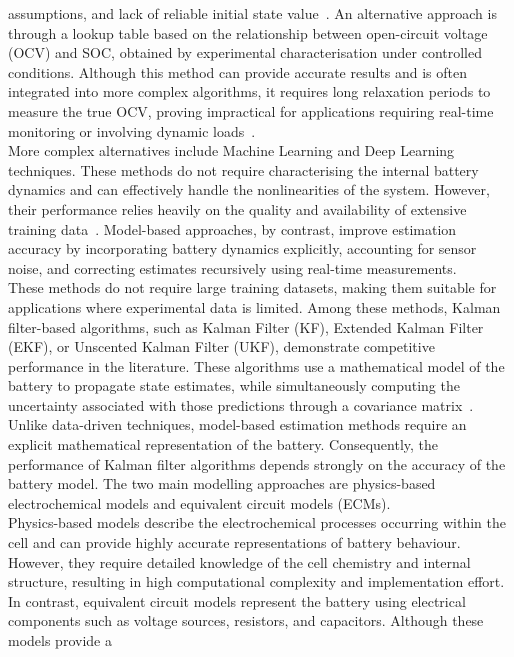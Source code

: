 assumptions, and lack of reliable initial state value~\cite{plett2015battery}. 
An alternative approach is through a lookup table based on the relationship between open-circuit voltage (\acs{OCV}) and \acs{SOC}, 
obtained by experimental characterisation under controlled conditions.
Although this method can provide accurate results and is often integrated into more complex algorithms, it requires 
long relaxation periods to measure the true \acs{OCV}, proving impractical for applications requiring real-time monitoring 
or involving dynamic loads~\cite{SOCSOH}.
\\
More complex alternatives include Machine Learning and Deep Learning techniques. These methods do not require characterising
the internal battery dynamics and can effectively handle the nonlinearities of the system. However, their performance
relies heavily on the quality and availability of extensive training data~\cite{Bosello2025}.
Model-based approaches, by contrast, improve estimation accuracy by incorporating battery dynamics explicitly, 
accounting for sensor noise, and correcting estimates recursively using real-time measurements.
\\
These methods do not require large training datasets, making them suitable for applications where experimental 
data is limited.
Among these methods, Kalman filter-based algorithms, such as Kalman Filter (\acs{KF}), Extended Kalman Filter (\acs{EKF}), or
Unscented Kalman Filter (\acs{UKF}), demonstrate competitive performance in the literature. 
These algorithms use a mathematical model of the battery to propagate state estimates, while simultaneously computing the 
uncertainty associated with those predictions through a covariance matrix~\cite{BatteryKalmanRaceCar}.
\\
Unlike data-driven techniques, model-based estimation methods require an explicit mathematical representation of the battery. 
Consequently, the performance of Kalman filter algorithms depends strongly on the accuracy of the battery model. 
The two main modelling approaches are physics-based electrochemical models and equivalent circuit models (\acsp{ECM}).
\\
Physics-based models describe the electrochemical processes occurring within the cell and can provide highly accurate 
representations of battery behaviour. However, they require detailed knowledge of the cell chemistry and internal structure, 
resulting in high computational complexity and implementation effort. In contrast, equivalent circuit models represent 
the battery using electrical components such as voltage sources, resistors, and capacitors. Although these models provide a 
